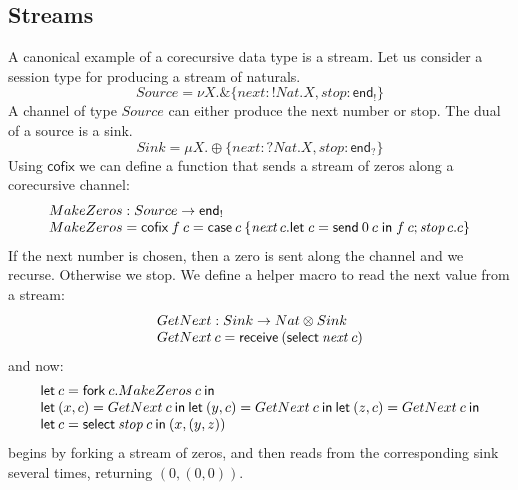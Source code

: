 \documentclass[orivec,envcountsame]{llncs}
\makeatletter
\newcommand{\with}{\mathbin\binampersand}
\newcommand{\gvout}[2]{{!#1.#2}}
\newcommand{\gvin}[2]{{?#1.#2}}
\newcommand{\lto}{\ensuremath{\multimap}}
\newcommand{\uto}{\ensuremath{\rightarrow}}
\newcommand{\outterm}{\mkwd{end}_!}
\newcommand{\interm}{\mkwd{end}_?}
\newcommand{\mkwd}[1]{\mathsf{#1}}
\newcommand{\clabel}[1]{\mathit{#1}}
\newcommand{\gvsend}[2]{\mkwd{send}\:#1\:#2}
\newcommand{\gvreceive}[1]{\mkwd{receive}\:#1}
\newcommand{\gvlet}[3]{\mkwd{let}\;#1 = #2\;\mkwd{in}\;#3}
\newcommand{\gvselect}[2]{\mkwd{select}\:#1\:#2}
\newcommand{\gvcase}[2]{\mkwd{case}\:#1\:\{#2\}}
\newcommand{\gvfork}[2]{\mkwd{fork}\:#1.#2}
\newcommand{\lrkwd}{\mkwd{cofix}}
\newcommand{\key}{\mkwd}
\newcommand{\cofix}{\lrkwd}
\newcommand{\ba}{\begin{array}}
\newcommand{\ea}{\end{array}}
\newcommand{\bl}{\ba[t]{@{}l@{}}}
\newcommand{\el}{\ea}
\makeatother
\begin{document}
\subsection{Streams}

A canonical example of a corecursive data type is a stream. Let us consider a session type for
producing a stream of naturals.
%
\small
\[
Source = \nu X.\with \{\clabel{next}: \gvout{Nat}{X}, \clabel{stop}: \outterm \}
\]
\normalsize
%
A channel of type $Source$ can either produce the next number or stop. The dual of a source is a
sink.
\small
\[
Sink = \mu X.\oplus \{\clabel{next}: \gvin{Nat}{X}, \clabel{stop}: \interm \}
\]
\normalsize
%
Using $\cofix$ we can define a function that sends a stream of zeros along a corecursive channel:
\small
\[
  \bl
  MakeZeros : Source \uto \outterm \\
  MakeZeros = \cofix\:f\:c = \gvcase{c}{\clabel{next}\,c.\gvlet{c}{\gvsend{0}{c}}{f\:c};
                                        \clabel{stop}\,c.c}
  \el
\]
\normalsize
If the next number is chosen, then a zero is sent along the channel and we recurse. Otherwise we
stop.
%
%
We define a helper macro to read the next value from a stream:
\small\[
\bl
GetNext : Sink \uto Nat \otimes Sink \\
GetNext\:c = \gvreceive{(\gvselect{\clabel{next}}{c})} \\
\el
\]\normalsize
and now:
\small\[
\bl
\key{let}\:c = \gvfork{c}{MakeZeros\:c}\:\key{in} \\
\key{let}\:(x, c) = GetNext\:c\:\key{in}\:
\key{let}\:(y, c) = GetNext\:c\:\key{in}\:
\key{let}\:(z, c) = GetNext\:c\:\key{in} \\
\key{let}\:c = \gvselect{\clabel{stop}}{c}\:\key{in}\:(x, (y, z)) \\
\el
\]\normalsize
begins by forking a stream of zeros, and then reads from the corresponding sink several times,
returning $(0, (0, 0))$.

\end{document}
